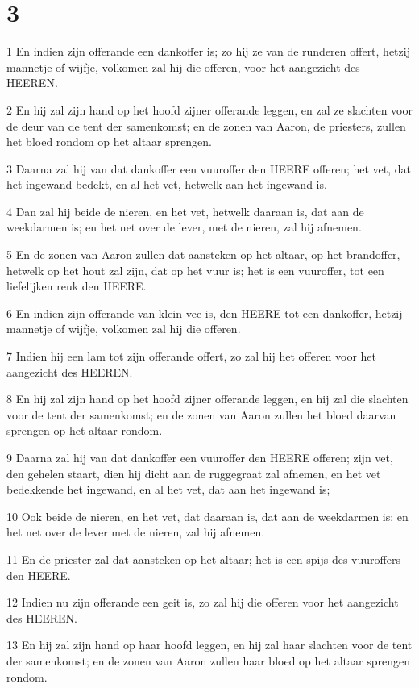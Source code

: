 \chapter{3}

\par 1 En indien zijn offerande een dankoffer is; zo hij ze van de runderen offert, hetzij mannetje of wijfje, volkomen zal hij die offeren, voor het aangezicht des HEEREN.
\par 2 En hij zal zijn hand op het hoofd zijner offerande leggen, en zal ze slachten voor de deur van de tent der samenkomst; en de zonen van Aaron, de priesters, zullen het bloed rondom op het altaar sprengen.
\par 3 Daarna zal hij van dat dankoffer een vuuroffer den HEERE offeren; het vet, dat het ingewand bedekt, en al het vet, hetwelk aan het ingewand is.
\par 4 Dan zal hij beide de nieren, en het vet, hetwelk daaraan is, dat aan de weekdarmen is; en het net over de lever, met de nieren, zal hij afnemen.
\par 5 En de zonen van Aaron zullen dat aansteken op het altaar, op het brandoffer, hetwelk op het hout zal zijn, dat op het vuur is; het is een vuuroffer, tot een liefelijken reuk den HEERE.
\par 6 En indien zijn offerande van klein vee is, den HEERE tot een dankoffer, hetzij mannetje of wijfje, volkomen zal hij die offeren.
\par 7 Indien hij een lam tot zijn offerande offert, zo zal hij het offeren voor het aangezicht des HEEREN.
\par 8 En hij zal zijn hand op het hoofd zijner offerande leggen, en hij zal die slachten voor de tent der samenkomst; en de zonen van Aaron zullen het bloed daarvan sprengen op het altaar rondom.
\par 9 Daarna zal hij van dat dankoffer een vuuroffer den HEERE offeren; zijn vet, den gehelen staart, dien hij dicht aan de ruggegraat zal afnemen, en het vet bedekkende het ingewand, en al het vet, dat aan het ingewand is;
\par 10 Ook beide de nieren, en het vet, dat daaraan is, dat aan de weekdarmen is; en het net over de lever met de nieren, zal hij afnemen.
\par 11 En de priester zal dat aansteken op het altaar; het is een spijs des vuuroffers den HEERE.
\par 12 Indien nu zijn offerande een geit is, zo zal hij die offeren voor het aangezicht des HEEREN.
\par 13 En hij zal zijn hand op haar hoofd leggen, en hij zal haar slachten voor de tent der samenkomst; en de zonen van Aaron zullen haar bloed op het altaar sprengen rondom.
